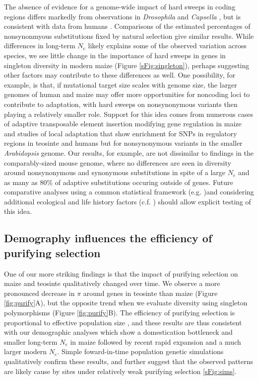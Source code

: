 \documentclass[12pt,a4paper]{article}
\begin{document}
The absence of evidence for a genome-wide impact of hard sweeps in coding regions differs markedly from observations in \emph{Drosophila} \cite{sattath2011} and \emph{Capsella} \cite{williamson2014}, but is consistent with data from humans \cite{hernandez2011}.
Comparisons of the estimated percentages of nonsynonmyous substitutions fixed by natural selection \cite{ross2009,sella2009,eyre2009estimating,williamson2014} give similar results. 
While differences in long-term $N_e$ likely explains some of the observed variation across species, we see little change in the importance of hard sweeps in genes in singleton diversity in modern maize (Figure \ref{sFig:singleton}), perhaps suggesting other factors may contribute to these differences as well.  
One possibility, for example, is that, if mutational target size scales with genome size, the larger genomes of human and maize may offer more opportunities for noncoding loci to contribute to adaptation, with hard sweeps on nonsynonymous variants then playing a relatively smaller role. 
Support for this idea comes from numerous cases of adaptive transposable element insertion modifying gene regulation in maize \cite{studer2011,mao2015,yang2013} and studies of local adaptation that show enrichment for SNPs in regulatory regions in teosinte \cite{pyhajarvi2013} and humans \cite{fraser2013gene} but for nonsynonymous variants in the smaller \emph{Arabidopsis} genome.  
Our results, for example, are not dissimilar to findings in the comparably-sized mouse genome, where no differences are seen in diversity around nonsynonymous and synonymous substitutions in spite of a large $N_e$ and  as many as 80\% of adaptive substitutions occuring outside of genes\cite{Halligan:2013ir}.
Future comparative analyses using a common statistical framework (e.g. \cite{corbett2015} )and considering additional ecological and life history factors (c.f. \cite{leffler2012}) should allow explicit testing of this idea.

\subsection*{Demography influences the efficiency of purifying selection} %
One of our more striking findings is that the impact of purifying selection on maize and teosinte qualitatively changed over time. 
We observe a more pronounced decrease in $\pi$ around genes in teosinte than maize (Figure \ref{fig:purify}A), but the opposite trend when we evaluate diversity using singleton polymorphisms (Figure \ref{fig:purify}B).
The efficiency of purifying selection is proportional to effective population size \cite{kimura1984}, and these results are thus consistent with our demographic analyses which show a domestication bottleneck and smaller long-term $N_e$ in maize \cite{eyre1998, tenaillon2004, wright2005, ross2009} followed by recent rapid expansion and a much larger modern $N_e$. 
Simple foward-in-time population genetic simulations qualitatively confirm these results, and further suggest that the observed patterns are likely cause by sites under relatively weak purifying selection \ref{sFig:sims}.
\end{document}
